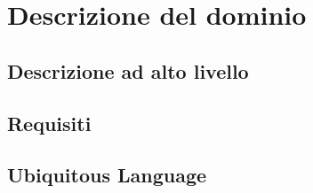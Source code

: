\section{Descrizione del dominio}

\subsection{Descrizione ad alto livello}

\subsection{Requisiti}

\subsection{Ubiquitous Language}